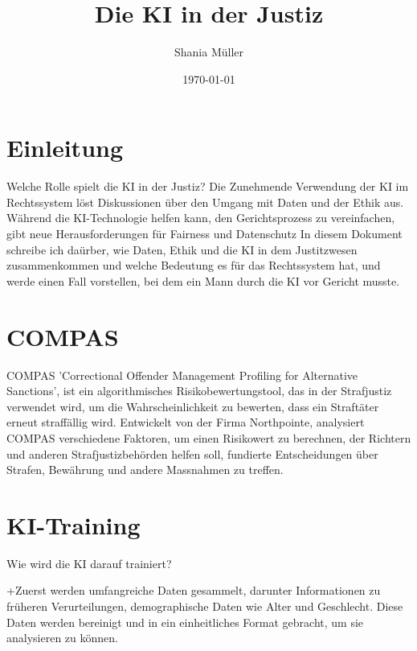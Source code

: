 \documentclass{article}
\title{Die KI in der Justiz}
\author{Shania Müller}
\date{\today}
\begin{document}
\maketitle


\tableofcontents


\newpage
\section {Einleitung}

Welche Rolle spielt die KI in der Justiz?  
Die Zunehmende Verwendung der KI im Rechtssystem löst Diskussionen über den 
Umgang mit Daten und der Ethik aus. Während die KI-Technologie helfen kann, den
Gerichtsprozess zu vereinfachen, gibt neue Herausforderungen für Fairness und Datenschutz
In diesem Dokument schreibe ich daürber, wie Daten, Ethik und die KI in dem Justitzwesen
zusammenkommen und welche Bedeutung es für das Rechtssystem hat, und werde einen Fall vorstellen, 
bei dem ein Mann durch die KI vor Gericht musste. 

\section {COMPAS}

COMPAS 'Correctional Offender Management Profiling for Alternative Sanctions', ist ein 
algorithmisches Risikobewertungstool, das in der Strafjustiz verwendet wird, um die 
Wahrscheinlichkeit zu bewerten, dass ein Straftäter erneut straffällig wird.
Entwickelt von der Firma Northpointe, analysiert COMPAS verschiedene Faktoren, um 
einen Risikowert zu berechnen, der Richtern und anderen 
Strafjustizbehörden helfen soll, fundierte Entscheidungen über Strafen, Bewährung und andere 
Massnahmen zu treffen.

\section {KI-Training}

Wie wird die KI darauf trainiert?

+Zuerst werden umfangreiche Daten gesammelt, darunter Informationen zu früheren Verurteilungen, 
demographische Daten wie Alter und Geschlecht. Diese Daten werden bereinigt und in ein einheitliches 
Format gebracht, um sie analysieren zu können.
\end{document}
